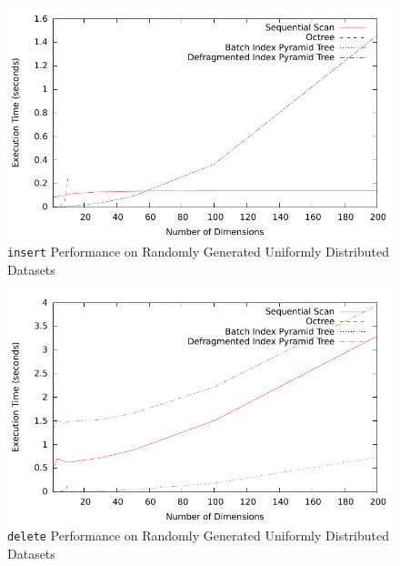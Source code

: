 \begin{figure}
	\centering
	\includegraphics[scale=0.8]{figures/performance_analysis/iteration_1/all_insert_randuniform.pdf}
	\caption{\texttt{insert} Performance on Randomly Generated Uniformly Distributed Datasets}
	\label{fig:perf-1-allinsert-d}
\end{figure}

\begin{figure}
	\centering
	\includegraphics[scale=0.8]{figures/performance_analysis/iteration_1/all_delete_randuniform.pdf}
	\caption{\texttt{delete} Performance on Randomly Generated Uniformly Distributed Datasets}
	\label{fig:perf-1-alldelete-d}
\end{figure}

